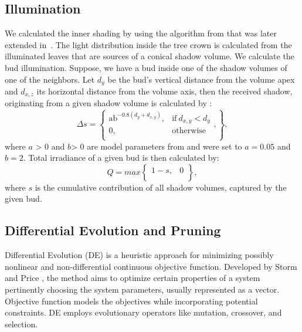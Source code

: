 \documentclass[1p]{elsarticle}
\begin{document}
\subsection{Illumination}

We calculated the inner shading by using the algorithm from \cite{palubicki_self-organizing_2009}
that was later extended in~\cite{pirk_plastic_2012,stava_inverse_2014,strnad_novel_2017}. The light distribution
inside the tree crown is calculated from the illuminated leaves that are
sources of a conical shadow volume. We calculate the bud illumination.
Suppose, we have a bud inside one of the shadow volumes of one of the
neighbors. Let \(d_{y}\) be the bud's vertical distance from the volume
apex and \(d_{x,z}\) its horizontal distance from the volume axis, then
the received shadow, originating from a given shadow volume is
calculated by \cite{strnad_novel_2017}:
\begin{equation}
\Delta s = \left\{ \begin{matrix}
\text{ab}^{- 0.8\left( d_{y} + d_{x,y} \right)}, & \mathrm{\text{if}}\ d_{x,y} < d_{y} \\
0, & \mathrm{otherwise} \\
\end{matrix}, \right\},
\end{equation}
where \(a\) \textgreater{} 0 and \(b\)\textgreater{} 0 are model
parameters from \cite{palubicki_self-organizing_2009} and were set to \(a = 0.05\) and \(b = 2\).
Total irradiance of a given bud is then calculated by:
\begin{equation}
  Q = max\begin{Bmatrix}
1 - s, & 0 \\
\end{Bmatrix},  
\end{equation}
where \(s\) is the cumulative contribution of all shadow volumes,
captured by the given bud.

\subsection{Differential Evolution and Pruning}
Differential Evolution (DE) is a heuristic approach for minimizing
possibly nonlinear and non-differential continuous objective function.
Developed by Storm and Price \cite{storn_differential_1997}, the method aims to optimize
certain properties of a system pertinently choosing the system
parameters, usually represented as a vector. Objective function models
the objectives while incorporating potential constraints. DE employs
evolutionary operators like mutation, crossover, and selection.
\end{document}
